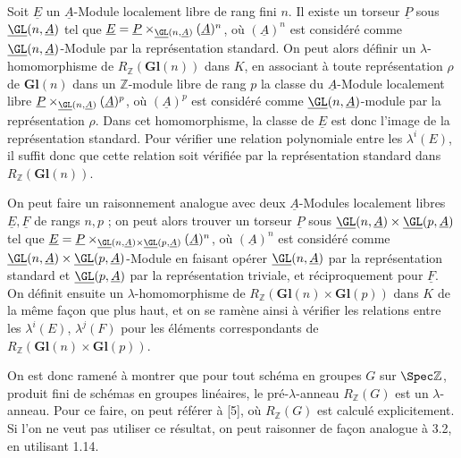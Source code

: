 
Soit \(\underline{E}\) un \(\underline{A}\)-Module localement libre de rang fini \(n\). Il existe un torseur \(\underline{P}\) sous \(\underline{\GL}(n,\underline{A})\) tel que \(\underline{E}=\underline{P}\times_{\underline{\GL}(n,\underline{A})} (\underline{A})^n\), où \((\underline{A})^n\) est considéré comme \(\underline{\GL}(n,\underline{A})\)-Module par la représentation standard. On peut alors définir un \(\lambda\)-homomorphisme de \(R_{\mathbb Z}(\mathbf{Gl}(n))\) dans \(K\), en associant à toute représentation \(\rho\) de \(\mathbf{Gl}(n)\) dans un \(\mathbb Z\)-module libre de rang \(p\) la classe du \(\underline{A}\)-Module localement libre
\(\underline{P}\times_{\underline{\GL}(n,\underline{A})} (\underline{A})^p\), où \((\underline{A})^p\) est considéré comme \(\underline{\GL}(n,\underline{A})\)-module par la représentation \(\rho\). Dans cet homomorphisme, la classe de \(\underline{E}\) est donc l'image de la représentation standard. Pour vérifier une relation polynomiale entre les \(\lambda^i(E)\), il suffit donc que cette relation soit vérifiée par la représentation standard dans \(R_{\mathbb Z}(\mathbf{Gl}(n))\).

On peut faire un raisonnement analogue avec deux \(\underline{A}\)-Modules localement libres \(\underline{E},\underline{F}\) de rangs \(n,p\) ; on peut alors trouver un torseur \(\underline{P}\) sous \(\underline{\GL}(n,\underline{A})\times\underline{\GL}(p,\underline{A})\) tel que \(\underline{E}=\underline{P}\times_{\underline{\GL}(n,\underline{A})\times\underline{\GL}(p,\underline{A})} (\underline{A})^n\), où \((\underline{A})^n\) est considéré comme \(\underline{\GL}(n,\underline{A})\times\underline{\GL}(p,\underline{A})\)-Module en faisant opérer \(\underline{\GL}(n,\underline{A})\) par la représentation standard et \(\underline{\GL}(p,\underline{A})\) par la représentation triviale, et réciproquement pour \(\underline{F}\). On définit ensuite un \(\lambda\)-homomorphisme de \(R_{\mathbb Z}(\mathbf{Gl}(n)\times\mathbf{Gl}(p))\) dans \(K\) de la même façon que plus haut, et on se ramène ainsi à vérifier les relations entre les \(\lambda^i(E)\), \(\lambda^j(F)\) pour les éléments correspondants de \(R_{\mathbb Z}(\mathbf{Gl}(n)\times\mathbf{Gl}(p))\).

On est donc ramené à montrer que pour tout schéma en groupes \(G\) sur \(\Spec\mathbb Z\), produit fini de schémas en groupes linéaires, le pré-\(\lambda\)-anneau \(R_{\mathbb Z}(G)\) est un \(\lambda\)-anneau. Pour ce faire, on peut référer à [5], où \(R_{\mathbb Z}(G)\) est calculé explicitement. Si l'on ne veut pas utiliser ce résultat, on peut raisonner de façon analogue à 3.2, en utilisant 1.14.

